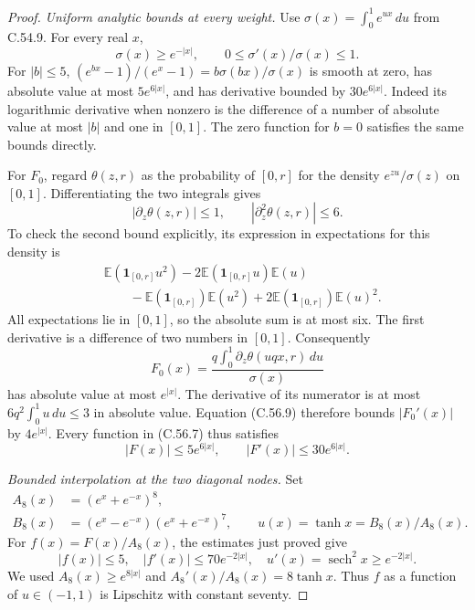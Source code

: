 \begin{proof}
\emph{Uniform analytic bounds at every weight.}
Use $\sigma(x)=\int_0^1e^{ux}\,du$ from C.54.9.
For every real $x$,
\[
 \sigma(x)\geq e^{-|x|},\qquad
                       0\leq\sigma'(x)/\sigma(x)\leq1. \tag{C.56.9}
\]
For $|b|\leq5$,
$(e^{bx}-1)/(e^x-1)=b\sigma(bx)/\sigma(x)$
is smooth at zero, has absolute value at most
$5e^{6|x|}$, and has derivative bounded by
$30e^{6|x|}$.
Indeed its logarithmic derivative when nonzero
is the difference of a number of absolute
value at most $|b|$ and one in $[0,1]$.
The zero function for $b=0$ satisfies the
same bounds directly.

For $F_0$, regard $\theta(z,r)$ as the
probability of $[0,r]$ for the density
$e^{zu}/\sigma(z)$ on $[0,1]$.
Differentiating the two integrals gives
\[
 |\partial_z\theta(z,r)|\leq1,\qquad
 |\partial_z^2\theta(z,r)|\leq6.                         \tag{C.56.10}
\]
To check the second bound explicitly, its
expression in expectations for this density is
\[
 \begin{split}
 &\mathbb E(\mathbf1_{[0,r]}u^2)
 -2\mathbb E(\mathbf1_{[0,r]}u)\mathbb E(u)\\
 &\qquad
 -\mathbb E(\mathbf1_{[0,r]})\mathbb E(u^2)
 +2\mathbb E(\mathbf1_{[0,r]})\mathbb E(u)^2 .
 \end{split}
\]
All expectations lie in $[0,1]$, so the
absolute sum is at most six.
The first derivative is a difference of
two numbers in $[0,1]$.
Consequently
\[
 F_0(x)=
 \frac{q\int_0^1\partial_z\theta(uqx,r)\,du}{\sigma(x)}
                                                        \tag{C.56.11}
\]
has absolute value at most $e^{|x|}$.
The derivative of its numerator is at most
$6q^2\int_0^1u\,du\leq3$ in absolute value.
Equation (C.56.9) therefore bounds
$|F_0'(x)|$ by $4e^{|x|}$.
Every function in (C.56.7) thus satisfies
\[
                 |F(x)|\leq5e^{6|x|},\qquad
                 |F'(x)|\leq30e^{6|x|}.                \tag{C.56.12}
\]

\emph{Bounded interpolation at the two diagonal nodes.}
Set
\[
 \begin{split}
 A_8(x)&=(e^x+e^{-x})^8,\\
 B_8(x)&=(e^x-e^{-x})(e^x+e^{-x})^7,\qquad
 u(x)=\tanh x=B_8(x)/A_8(x).
 \end{split}                                            \tag{C.56.13}
\]
For $f(x)=F(x)/A_8(x)$, the estimates just proved give
\[
 |f(x)|\leq5,\quad |f'(x)|\leq70e^{-2|x|},\quad
        u'(x)=\operatorname{sech}^2x\geq e^{-2|x|}.
                                                        \tag{C.56.14}
\]
We used $A_8(x)\geq e^{8|x|}$ and
$A_8'(x)/A_8(x)=8\tanh x$.
Thus $f$ as a function of $u\in(-1,1)$ is
Lipschitz with constant seventy.


\end{proof}
